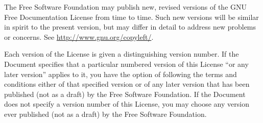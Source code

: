 The Free Software Foundation may publish new, revised versions of the
GNU Free Documentation License from time to time. Such new versions will
be similar in spirit to the present version, but may differ in detail to
address new problems or concerns. See
\url{http://www.gnu.org/copyleft/}.

Each version of the License is given a distinguishing version number. If
the Document specifies that a particular numbered version of this
License ``or any later version'' applies to it, you have the option of
following the terms and conditions either of that specified version or
of any later version that has been published (not as a draft) by the
Free Software Foundation. If the Document does not specify a version
number of this License, you may choose any version ever published (not
as a draft) by the Free Software Foundation.
